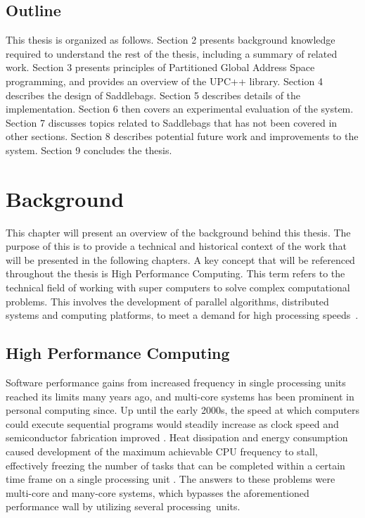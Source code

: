 \documentclass{uit-report}
\begin{document}


\section{Outline}
This thesis is organized as follows. Section 2 presents background knowledge required to understand the rest of the thesis, including a summary of related work. Section 3 presents principles of Partitioned Global Address Space programming, and provides an overview of the UPC++ library. Section 4 describes the design of Saddlebags. Section 5 describes details of the implementation. Section 6 then covers an experimental evaluation of the system. Section 7 discusses topics related to Saddlebags that has not been covered in other sections. Section 8 describes potential future work and improvements to the system. Section 9 concludes the thesis.

\newpage
\mbox{} \pagebreak
\chapter{Background}
This chapter will present an overview of the background behind this thesis. The purpose of this is to provide a technical and historical context of the work that will be presented in the following chapters. A key concept that will be referenced throughout the thesis is High Performance Computing. This term refers to the technical field of working with super computers to solve complex computational problems. This involves the development of parallel algorithms, distributed systems and computing platforms, to meet a demand for high processing speeds~\cite{hpc_def}.

%  
\section{High Performance Computing}

Software performance gains from increased frequency in single processing units reached its limits many years ago, and multi-core systems has been prominent in personal computing since. Up until the early 2000s, the speed at which computers could execute sequential programs would steadily increase as clock speed and semiconductor fabrication improved \cite{sutter_larus_2005}. Heat dissipation and energy consumption caused development of the maximum achievable CPU frequency to stall, effectively freezing the number of tasks that can be completed within a certain time frame on a single processing unit \cite{diaz_munoz-caro_nino_2012}. The answers to these problems were multi-core and many-core systems, which bypasses the aforementioned performance wall by utilizing several processing~units.
\end{document}
